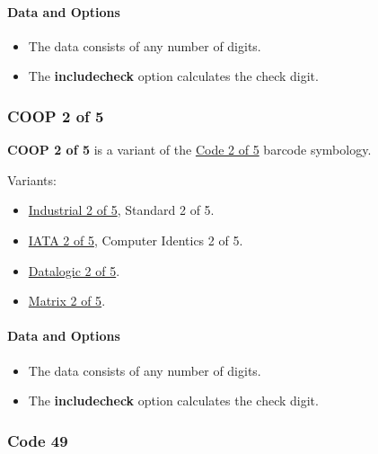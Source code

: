 \hypertarget{data-and-options-70}{%
\paragraph{Data and Options}\label{data-and-options-70}}

\begin{itemize}
\tightlist
\item
  The data consists of any number of digits.
\item
  The \textbf{includecheck} option calculates the check digit.
\end{itemize}

\hypertarget{coop-2-of-5}{%
\subsubsection{COOP 2 of 5}\label{coop-2-of-5}}

\textbf{COOP 2 of 5} is a variant of the
\protect\hyperlink{code-25}{Code 2 of 5} barcode symbology.

Variants:

\begin{itemize}
\tightlist
\item
  \protect\hyperlink{code-25}{Industrial 2 of 5}, Standard 2 of 5.
\item
  \protect\hyperlink{iata-2-of-5}{IATA 2 of 5}, Computer Identics 2 of
  5.
\item
  \protect\hyperlink{datalogic-2-of-5}{Datalogic 2 of 5}.
\item
  \protect\hyperlink{matrix-2-of-5}{Matrix 2 of 5}.
\end{itemize}

\hypertarget{data-and-options-71}{%
\paragraph{Data and Options}\label{data-and-options-71}}

\begin{itemize}
\tightlist
\item
  The data consists of any number of digits.
\item
  The \textbf{includecheck} option calculates the check digit.
\end{itemize}

\hypertarget{code-49}{%
\subsubsection{Code 49}\label{code-49}}

